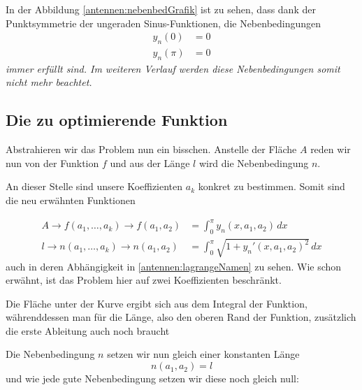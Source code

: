 In der Abbildung \ref{antennen:nebenbedGrafik} ist zu sehen, dass dank der Punktsymmetrie 
der ungeraden Sinus-Funktionen, die Nebenbedingungen
\begin{equation}
	\begin{aligned}
		y_n(0)
		&=
		0
		\\
		y_n(\pi)
		&=
		0
	\end{aligned}
\label{antennen:nebenbed3eck}
\end{equation}
\em immer erfüllt \em sind. Im weiteren Verlauf werden diese 
Nebenbedingungen somit nicht mehr beachtet.

\subsection{Die zu optimierende Funktion \label{antennen:optmFunktion}}


Abstrahieren wir das Problem nun ein bisschen. Anstelle der Fläche $A$ reden wir nun von 
der Funktion $f$ und aus der Länge $l$ wird die Nebenbedingung $n$. 

An dieser Stelle sind unsere Koeffizienten $a_k$ konkret zu bestimmen. 
Somit sind die neu erwähnten Funktionen 

\begin{equation}
\begin{aligned}
	A
	\rightarrow
	f(a_1,\ldots,a_k)
	\rightarrow
	f(a_1,a_2)
	&=
	\int_{0}^{\pi} y_n(x,a_1,a_2)\, dx
	\\
	l
	\rightarrow
	n(a_1,\ldots,a_k)
	\rightarrow
	n(a_1,a_2)
	&=
	\int_{0}^{\pi} \sqrt{1+y_n'(x, a_1, a_2)^2}\, dx
\end{aligned}
\label{antennen:lagrangeNamen}
\end{equation}
auch in deren Abhängigkeit in \eqref{antennen:lagrangeNamen} zu sehen. Wie schon erwähnt, 
ist das Problem hier auf zwei Koeffizienten beschränkt. 

Die Fläche unter der Kurve ergibt sich aus dem Integral der Funktion, 
währenddessen man für die Länge, also den oberen Rand der Funktion, 
zusätzlich die erste Ableitung auch noch braucht

Die Nebenbedingung $n$ setzen wir nun gleich einer konstanten Länge
\begin{equation}
n(a_1, a_2)
=
l
\label{antennen:constNebenbed}
\end{equation}
und wie jede gute Nebenbedingung setzen wir diese noch gleich null:

